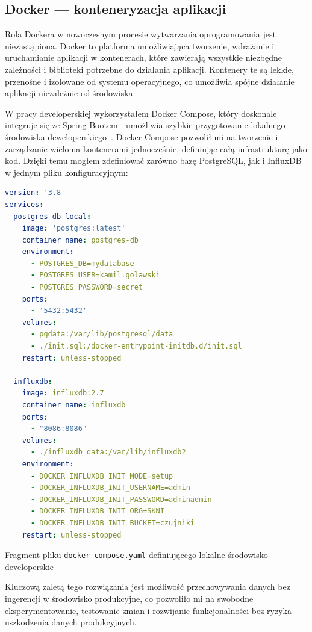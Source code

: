 \documentclass[a4paper,12pt,openany]{book}
\begin{document}
\subsection*{Docker --- konteneryzacja aplikacji}

Rola Dockera w nowoczesnym procesie wytwarzania oprogramowania jest niezastąpiona. Docker to platforma umożliwiająca tworzenie, wdrażanie i uruchamianie aplikacji w kontenerach, które zawierają wszystkie niezbędne zależności i biblioteki potrzebne do działania aplikacji. Kontenery te są lekkie, przenośne i izolowane od systemu operacyjnego, co umożliwia spójne działanie aplikacji niezależnie od środowiska.

W pracy developerskiej wykorzystałem Docker Compose, który doskonale integruje się ze Spring Bootem i umożliwia szybkie przygotowanie lokalnego środowiska deweloperskiego~\cite{bib:docker2023}. Docker Compose pozwolił mi na tworzenie i zarządzanie wieloma kontenerami jednocześnie, definiując całą infrastrukturę jako kod. Dzięki temu mogłem zdefiniować zarówno bazę PostgreSQL, jak i InfluxDB w jednym pliku konfiguracyjnym:

\begin{lstfloat}[htbp]
\begin{lstlisting}[language=yaml]
version: '3.8'
services:
  postgres-db-local:
    image: 'postgres:latest'
    container_name: postgres-db
    environment:
      - POSTGRES_DB=mydatabase
      - POSTGRES_USER=kamil.golawski
      - POSTGRES_PASSWORD=secret
    ports:
      - '5432:5432'
    volumes:
      - pgdata:/var/lib/postgresql/data
      - ./init.sql:/docker-entrypoint-initdb.d/init.sql
    restart: unless-stopped

  influxdb:
    image: influxdb:2.7
    container_name: influxdb
    ports:
      - "8086:8086"
    volumes:
      - ./influxdb_data:/var/lib/influxdb2
    environment:
      - DOCKER_INFLUXDB_INIT_MODE=setup
      - DOCKER_INFLUXDB_INIT_USERNAME=admin
      - DOCKER_INFLUXDB_INIT_PASSWORD=adminadmin
      - DOCKER_INFLUXDB_INIT_ORG=SKNI
      - DOCKER_INFLUXDB_INIT_BUCKET=czujniki
    restart: unless-stopped
\end{lstlisting}
\caption{Fragment pliku \texttt{docker-compose.yaml} definiującego lokalne środowisko developerskie}
\label{lst:docker-compose}
\end{lstfloat}

Kluczową zaletą tego rozwiązania jest możliwość przechowywania danych bez ingerencji w środowisko produkcyjne, co pozwoliło mi na swobodne eksperymentowanie, testowanie zmian i rozwijanie funkcjonalności bez ryzyka uszkodzenia danych produkcyjnych.
\end{document}
